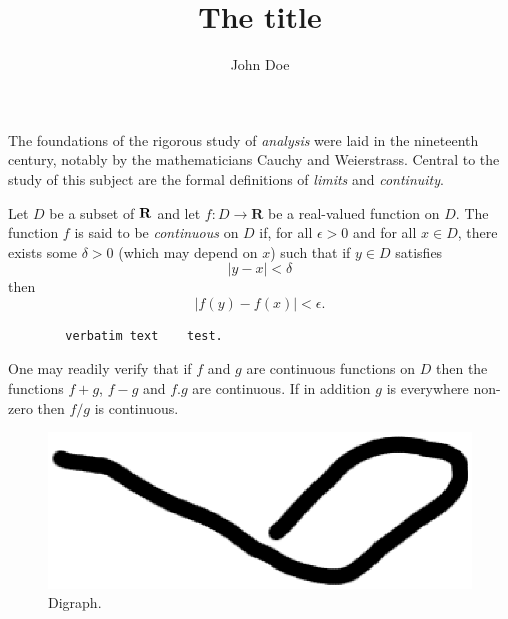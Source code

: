 \documentclass[a4paper,12pt,oneside]{article}
\title{The title}
\author{John Doe}
\begin{document}
	The foundations of the rigorous study of \emph{analysis}
	were laid in the nineteenth century, notably by the
	mathematicians Cauchy and Weierstrass. Central to the
	study of this subject are the formal definitions of
	\emph{limits} and \emph{continuity}.
	
	\sffamily
	Let $D$ be a subset of $\bf R$ and let
	$f \colon D \to \mathbf{R}$ be a real-valued function on
	$D$. The function $f$ is said to be \emph{continuous} on
	$D$ if, for all $\epsilon > 0$ and for all $x \in D$,
	there exists some $\delta > 0$ (which may depend on $x$)
	such that if $y \in D$ satisfies
	\[ |y - x| < \delta \]
	then
	\[ |f(y) - f(x)| < \epsilon. \]
	\begin{verbatim}
		verbatim text    test.
	\end{verbatim}
	
	One may readily verify that if $f$ and $g$ are continuous
	functions on $D$ then the functions $f+g$, $f-g$ and
	$f.g$ are continuous. If in addition $g$ is everywhere
	non-zero then $f/g$ is continuous.

	\begin{figure}[htp]
		\centering
		\includegraphics[scale=.7]{motor.eps}
		\caption{Digraph.}
		\label{fig:digraph}
	\end{figure}
\end{document}
